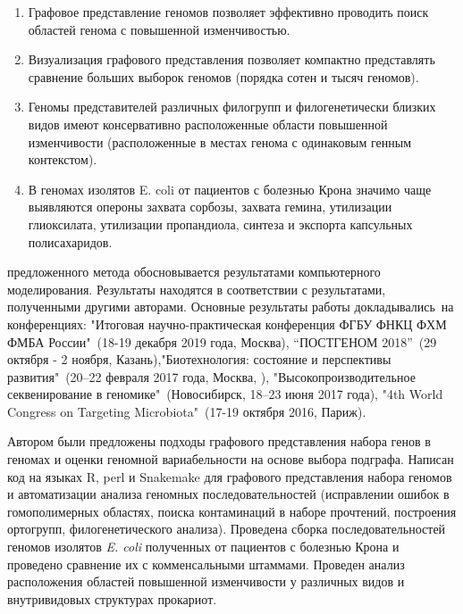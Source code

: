 {}
\begin{enumerate}[beginpenalty=10000] %
	
    \item Графовое представление геномов позволяет эффективно проводить поиск областей генома с повышенной изменчивостью.

	\item Визуализация графового представления позволяет компактно представлять сравнение больших выборок геномов (порядка сотен и тысяч геномов).

 	\item Геномы представителей различных филогрупп и филогенетически близких видов имеют консервативно расположенные области повышенной изменчивости (расположенные в местах генома с одинаковым генным контекстом).
 	
     \item В геномах изолятов E. coli от пациентов с болезнью Крона значимо чаще выявляются опероны захвата сорбозы, захвата гемина, утилизации глиоксилата, утилизации пропандиола, синтеза и экспорта капсульных полисахаридов.

\end{enumerate}


{\reliability} предложенного метода обосновывается результатами компьютерного моделирования. Результаты находятся в соответствии с результатами, полученными другими авторами. Основные результаты работы докладывались~на конференциях: "Итоговая научно-практическая конференция ФГБУ ФНКЦ ФХМ ФМБА России"\ (18-19 декабря 2019 года, Москва), “ПОСТГЕНОМ 2018”\ (29 октября - 2 ноября, Казань),"Биотехнология: состояние и перспективы развития"\ (20–22 февраля 2017 года, Москва, ), "Высокопроизводительное секвенирование в геномике"\ (Новосибирск, 18–23 июня 2017 года), "4th World Congress on Targeting Microbiota"\ (17-19 октября 2016, Париж).


{\contribution} 
Автором были предложены подходы графового представления набора генов в геномах и оценки геномной вариабельности на основе выбора подграфа. Написан код на языках R, perl и Snakemake для графового представления набора геномов и автоматизации анализа геномных последовательностей (исправлении ошибок в гомополимерных областях, поиска контаминаций в наборе прочтений, построения ортогрупп, филогенетического анализа). Проведена сборка последовательностей геномов изолятов \textit{E. coli} полученных от пациентов с болезнью Крона и проведено сравнение их с комменсальными штаммами. Проведен анализ расположения областей повышенной изменчивости у различных видов и внутривидовых структурах прокариот.

